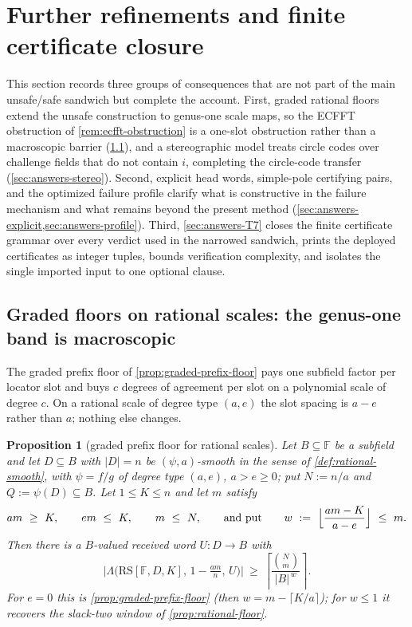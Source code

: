\documentclass[11pt]{article}
\newtheorem{proposition}[theorem]{Proposition}
\theoremstyle{definition}
\theoremstyle{remark}
\newcommand{\F}{\mathbb{F}}
\newcommand{\B}{B}
\newcommand{\RS}{\mathrm{RS}}
\newcommand{\Lst}{\Lambda}
\begin{document}
\section{Further refinements and finite certificate closure}\label{sec:answers}

This section records three groups of consequences that are not part of the main unsafe/safe sandwich but complete the account.  First, graded rational floors extend the unsafe construction to genus-one scale maps, so the ECFFT obstruction of \cref{rem:ecfft-obstruction} is a one-slot obstruction rather than a macroscopic barrier (\cref{sec:answers-isogeny}), and a stereographic model treats circle codes over challenge fields that do not contain $i$, completing the circle-code transfer (\cref{sec:answers-stereo}).  Second, explicit head words, simple-pole certifying pairs, and the optimized failure profile clarify what is constructive in the failure mechanism and what remains beyond the present method (\cref{sec:answers-explicit,sec:answers-profile}).  Third, \cref{sec:answers-T7} closes the finite certificate grammar over every verdict used in the narrowed sandwich, prints the deployed certificates as integer tuples, bounds verification complexity, and isolates the single imported input to one optional clause.

\subsection{Graded floors on rational scales: the genus-one band is macroscopic}\label{sec:answers-isogeny}

The graded prefix floor of \cref{prop:graded-prefix-floor} pays one subfield factor per locator slot and buys $c$ degrees of agreement per slot on a polynomial scale of degree $c$. On a rational scale of degree type $(a,e)$ the slot spacing is $a-e$ rather than $a$; nothing else changes.

\begin{proposition}[graded prefix floor for rational scales]\label{prop:graded-rational-floor}
Let $\B\subseteq\F$ be a subfield and let $D\subseteq\B$ with $|D|=n$ be $(\psi,a)$-smooth in the sense of \cref{def:rational-smooth}, with $\psi=f/g$ of degree type $(a,e)$, $a>e\ge0$; put $N:=n/a$ and $Q:=\psi(D)\subseteq\B$. Let $1\le K\le n$ and let $m$ satisfy
\[
am\ \ge\ K,\qquad em\ \le\ K,\qquad m\ \le\ N,
\qquad\text{and put}\qquad
w\ :=\ \Bigl\lfloor\frac{am-K}{a-e}\Bigr\rfloor\ \le\ m .
\]
Then there is a $\B$-valued received word $U:D\to\B$ with
\[
\bigl|\Lst\bigl(\RS[\F,D,K],\,1-\tfrac{am}{n},\,U\bigr)\bigr|
\ \ge\
\left\lceil\frac{\binom Nm}{|\B|^{\,w}}\right\rceil .
\]
For $e=0$ this is \cref{prop:graded-prefix-floor} \textup(then $w=m-\lceil K/a\rceil$\textup); for $w\le1$ it recovers the slack-two window of \cref{prop:rational-floor}.
\end{proposition}
\end{document}
